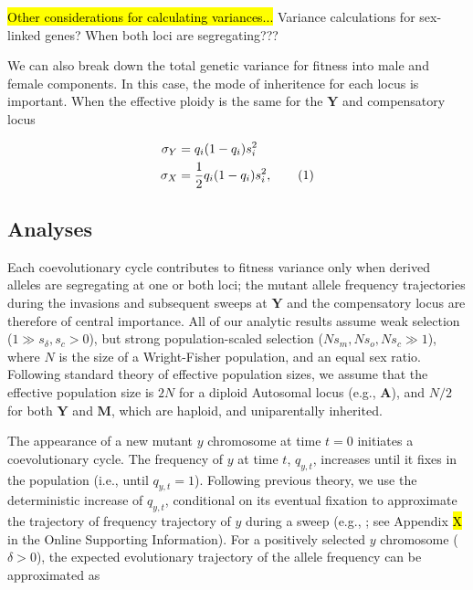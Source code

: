 \documentclass{article}
\newcommand\numberthis{\addtocounter{equation}{1}\tag{\theequation}}
\begin{document}
\hl{Other considerations for calculating variances...} Variance calculations for sex-linked genes? When both loci are segregating??? 

We can also break down the total genetic variance for fitness into male and female components. In this case, the mode of inheritence for each locus is important. When the effective ploidy is the same for the $\mathbf{Y}$ and compensatory locus

\begin{linenomath}\begin{align*} \label{eq:abc}
	\sigma_{Y} &= q_{i}(1 - q_{i})s_{i}^{2} \\
	\sigma_{X} &	= \frac{1}{2}q_{i}(1 - q_{i})s_{i}^{2}, \numberthis
\end{align*}\end{linenomath}


\subsection{Analyses} \label{subsec:Analyses}

Each coevolutionary cycle contributes to fitness variance only when derived alleles are segregating at one or both loci; the mutant allele frequency trajectories during the invasions and subsequent sweeps at $\mathbf{Y}$ and the compensatory locus are therefore of central importance. All of our analytic results assume weak selection ($1 \gg s_{\delta}, s_c > 0$), but strong population-scaled selection ($N s_m, N s_o, N s_c \gg 1$), where $N$ is the size of a Wright-Fisher population, and an equal sex ratio. Following standard theory of effective population sizes, we assume that the effective population size is $2N$ for a diploid Autosomal locus (e.g., $\mathbf{A}$), and $N/2$ for both $\mathbf{Y}$ and $\mathbf{M}$, which are haploid, and uniparentally inherited.

The appearance of a new mutant $y$ chromosome at time $t = 0$ initiates a coevolutionary cycle. The frequency of $y$ at time $t$, $q_{y,t}$, increases until it fixes in the population (i.e., until $q_{y,t} = 1$). Following previous theory, we use the deterministic increase of $q_{y,t}$, conditional on its eventual fixation to approximate the trajectory of frequency trajectory of $y$ during a sweep (e.g., \citealt{MaynardSmith1976,Ewens2004}; see Appendix \hl{X} in the Online Supporting Information). For a positively selected $y$ chromosome ($\delta > 0$), the expected evolutionary trajectory of the allele frequency can be approximated as 
\end{document}
